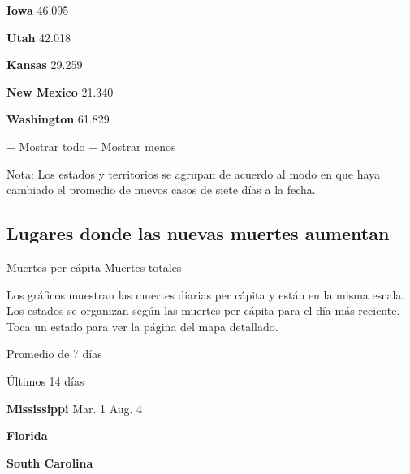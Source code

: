 \textbf{Iowa} 46.095

\href{https://www.nytimes3xbfgragh.onion/interactive/2020/us/utah-coronavirus-cases.html}{}

\textbf{Utah} 42.018

\href{https://www.nytimes3xbfgragh.onion/interactive/2020/us/kansas-coronavirus-cases.html}{}

\textbf{Kansas} 29.259

\href{https://www.nytimes3xbfgragh.onion/interactive/2020/us/new-mexico-coronavirus-cases.html}{}

\textbf{New Mexico} 21.340

\href{https://www.nytimes3xbfgragh.onion/interactive/2020/us/washington-coronavirus-cases.html}{}

\textbf{Washington} 61.829

+ Mostrar todo + Mostrar menos

Nota: Los estados y territorios se agrupan de acuerdo al modo en que
haya cambiado el promedio de nuevos casos de siete días a la fecha.

\hypertarget{lugares-donde-las-nuevas-muertes-aumentan}{%
\subsection{Lugares donde las nuevas muertes
aumentan}\label{lugares-donde-las-nuevas-muertes-aumentan}}

Muertes per cápita Muertes totales

Los gráficos muestran las muertes diarias per cápita y están en la misma
escala. Los estados se organizan según las muertes per cápita para el
día más reciente. Toca un estado para ver la página del mapa detallado.

\href{https://www.nytimes3xbfgragh.onion/interactive/2020/us/mississippi-coronavirus-cases.html}{}

Promedio de 7 días

Últimos 14 días

\textbf{Mississippi} Mar. 1 Aug. 4

\href{https://www.nytimes3xbfgragh.onion/interactive/2020/us/florida-coronavirus-cases.html}{}

\textbf{Florida}

\href{https://www.nytimes3xbfgragh.onion/interactive/2020/us/south-carolina-coronavirus-cases.html}{}

\textbf{South Carolina}

\href{https://www.nytimes3xbfgragh.onion/interactive/2020/us/louisiana-coronavirus-cases.html}{}

